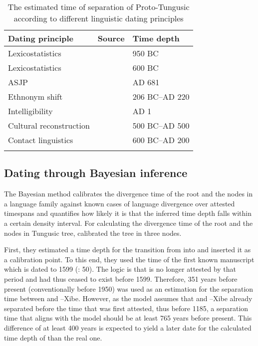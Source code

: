 \documentclass[output=paper,colorlinks,citecolor=brown]{langscibook}
\begin{document}
\begin{table}
\begin{tabular}{ l l l }
  \lsptoprule
Dating principle        &	Source                           &	Time depth\\
  \midrule
Lexicostatistics        &	\citealt{Dybo2019}               &	950 BC\\
Lexicostatistics        &	\citealt{Korovina2011}           &	600 BC\\
ASJP                    &  	\citealt{Holman2011}             &	AD 681\\
Ethnonym shift          &	\citealt{Robbeets2015}           &	206 BC--AD 220\\
Intelligibility         &	\citealt{Pevnov2012}             &	AD 1\\
Cultural reconstruction &	\citealt{Janhunen2012a}          &	500 BC--AD 500\\
Contact linguistics     &	\citealt{Robbeetsetal2020}       &	600 BC--AD 200\\
  \lspbottomrule
\end{tabular}
\caption{The estimated time of separation of Proto-Tungusic according to different linguistic dating principles}
\label{table:8.1}
\end{table}


\subsection{Dating through Bayesian inference}\label{Section8.3.2}\largerpage

The Bayesian method calibrates the divergence time of the root and the nodes in a language family against known cases of language divergence over attested timespans and quantifies how likely it is that the inferred time depth falls within a certain density interval. For calculating the divergence time of the root and the nodes in Tungusic tree, \citet{Oskolskayaetal2022} calibrated the tree in three nodes.

First, they estimated a time depth for the transition from  into  and inserted it as a calibration point. To this end, they used the time of the first known  manuscript which is dated to 1599 (\citealt{Gorelova2002}: 50). The logic is that  is no longer attested by that period and had thus ceased to exist before 1599. Therefore, 351 years before present (conventionally before 1950) was used as an estimation for the separation time between  and –Xibe. However, as the model assumes that  and –Xibe already separated before the time that  was first attested, thus before 1185, a separation time that aligns with the model should be at least 765 years before present. This difference of at least 400 years is expected to yield a later date for the calculated time depth of  than the real one.
\end{document}
